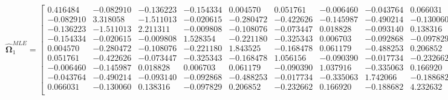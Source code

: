 \documentclass{article}\usepackage[]{graphicx}\usepackage[]{xcolor}
\def\bs{\boldsymbol}
\begin{document}
 \[
 \widehat{\bs{\Omega}}_{1}^{MLE} = 
 
  \begin{bmatrix}
 
 
 
 0.416484 & -0.082910 & -0.136223 & -0.154334 & 0.004570 & 0.051761 & -0.006460 & -0.043764 & 0.066031\\
 
 -0.082910 & 3.318058 & -1.511013 & -0.020615 & -0.280472 & -0.422626 & -0.145987 & -0.490214 & -0.130060\\
 
 -0.136223 & -1.511013 & 2.211311 & -0.009808 & -0.108076 & -0.073447 & 0.018828 & -0.093140 & 0.138316\\
 
 -0.154334 & -0.020615 & -0.009808 & 1.528354 & -0.221180 & -0.325343 & 0.006703 & -0.092868 & -0.097829\\
 
 0.004570 & -0.280472 & -0.108076 & -0.221180 & 1.843525 & -0.168478 & 0.061179 & -0.488253 & 0.206852\\
 
 0.051761 & -0.422626 & -0.073447 & -0.325343 & -0.168478 & 1.056156 & -0.090390 & -0.017734 & -0.232662\\
 
 -0.006460 & -0.145987 & 0.018828 & 0.006703 & 0.061179 & -0.090390 & 1.037916 & -0.335063 & 0.166920\\
 
 -0.043764 & -0.490214 & -0.093140 & -0.092868 & -0.488253 & -0.017734 & -0.335063 & 1.742066 & -0.188682\\
 
 0.066031 & -0.130060 & 0.138316 & -0.097829 & 0.206852 & -0.232662 & 0.166920 & -0.188682 & 4.232632\\
 
 
 \end{bmatrix}
 \]
 
\end{document}
